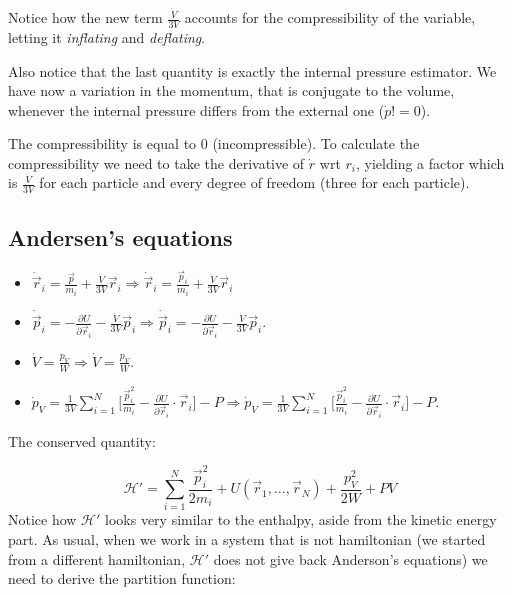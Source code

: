 Notice how the new term $ \frac{\dot{V}}{3V}$ accounts for the compressibility of the variable, letting it \textit{inflating} and \textit{deflating}.

Also notice that the last quantity is exactly the internal pressure estimator. We have now a variation in the momentum, that is conjugate to the volume, whenever the internal pressure differs from the external one ($\dot{p} != 0$).

The compressibility is equal to $0$ (incompressible).
To calculate the compressibility we need to take the derivative of $\dot{r}$ wrt $r_i$, yielding a factor which is $\frac{\dot{V}}{3V}$ for each particle and every degree of freedom (three for each particle).

	\subsection{Andersen's equations}

	\begin{multicols}{2}
		\begin{itemize}
			\item $\dot{\vec{r}}_i = \frac{\vec{p}}{m_i} + \frac{\dot{V}}{3V}\vec{r}_i\Rightarrow\dot{\vec{r}}_i = \frac{\vec{p}_i}{m_i} + \frac{\dot{V}}{3V}\vec{r}_i$
			\item $\dot{\vec{p}}_i = -\frac{\partial U}{\partial\vec{r}_i} -\frac{\dot{V}}{3V}\vec{p}_i\Rightarrow \dot{\vec{p}}_i = -\frac{\partial U}{\partial\vec{r}_i}-\frac{\dot{V}}{3V}\vec{p}_i$.
			\item $\dot{V} = \frac{p_V}{W}\Rightarrow\dot{V} = \frac{p_V}{W}$.
			\item $\dot{p}_V = \frac{1}{3V}\sum\limits_{i=1}^N\biggl[\frac{\vec{p}_i^2}{m_i}-\frac{\partial U}{\partial\vec{r}_i}\cdot\vec{r}_i\biggr]-P\Rightarrow\dot{p}_V = \frac{1}{3V}\sum\limits_{i=1}^N\biggl[\frac{\vec{p}_i^2}{m_i}-\frac{\partial U}{\partial\vec{r}_i}\cdot\vec{r}_i\biggr]-P$.
		\end{itemize}
	\end{multicols}

	The conserved quantity:

	$$\mathcal{H}' = \sum\limits_{i=1}^N\frac{\vec{p}_i^2}{2m_i} + U(\vec{r}_1, \dots, \vec{r}_N) + \frac{p_V^2}{2W}+PV$$
	Notice how $\mathcal{H}'$ looks very similar to the enthalpy, aside from the kinetic energy part.
	As usual, when we work in a system that is not hamiltonian (we started from a different hamiltonian, $\mathcal{H}'$ does not give back Anderson's equations) we need to derive the partition function:

